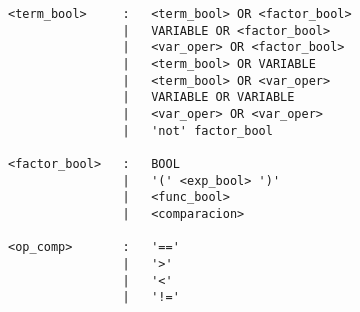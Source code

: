 \begin{verbatim}
<term_bool>     :   <term_bool> OR <factor_bool>
                |   VARIABLE OR <factor_bool>
                |   <var_oper> OR <factor_bool>
                |   <term_bool> OR VARIABLE
                |   <term_bool> OR <var_oper>
                |   VARIABLE OR VARIABLE
                |   <var_oper> OR <var_oper>
                |   'not' factor_bool

<factor_bool>   :   BOOL
                |   '(' <exp_bool> ')'
                |   <func_bool>
                |   <comparacion>

<op_comp>       :   '=='
                |   '>'
                |   '<'
                |   '!='


    
\end{verbatim}
